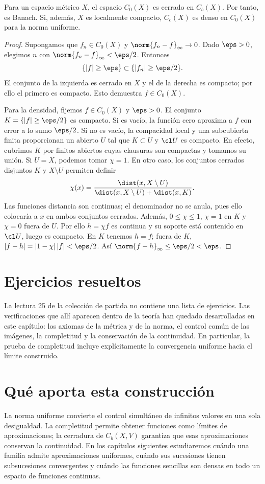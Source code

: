 \begin{proposicion}
Para un espacio métrico $X$, el espacio $C_0(X)$ es cerrado en $C_b(X)$. Por tanto, es Banach. Si, además, $X$ es localmente compacto, $C_c(X)$ es denso en $C_0(X)$ para la norma uniforme.
\end{proposicion}
\begin{proof}
Supongamos que $f_n\in C_0(X)$ y $\norm{f_n-f}_\infty\to0$. Dado $\eps>0$, elegimos $n$ con $\norm{f_n-f}_\infty<\eps/2$. Entonces
\[
 \{|f|\ge\eps\}\subset\{|f_n|\ge\eps/2\}.
\]
El conjunto de la izquierda es cerrado en $X$ y el de la derecha es compacto; por ello el primero es compacto. Esto demuestra $f\in C_0(X)$.

Para la densidad, fijemos $f\in C_0(X)$ y $\eps>0$. El conjunto $K=\{|f|\ge\eps/2\}$ es compacto. Si es vacío, la función cero aproxima a $f$ con error a lo sumo $\eps/2$. Si no es vacío, la compacidad local y una subcubierta finita proporcionan un abierto $U$ tal que $K\subset U$ y $\cl U$ es compacto. En efecto, cubrimos $K$ por finitos abiertos cuyas clausuras son compactas y tomamos su unión. Si $U=X$, podemos tomar $\chi=1$. En otro caso, los conjuntos cerrados disjuntos $K$ y $X\setminus U$ permiten definir
\[
 \chi(x)=\frac{\dist(x,X\setminus U)}{\dist(x,X\setminus U)+\dist(x,K)}.
\]
Las funciones distancia son continuas; el denominador no se anula, pues ello colocaría a $x$ en ambos conjuntos cerrados. Además, $0\le\chi\le1$, $\chi=1$ en $K$ y $\chi=0$ fuera de $U$. Por ello $h=\chi f$ es continua y su soporte está contenido en $\cl U$, luego es compacto. En $K$ tenemos $h=f$; fuera de $K$,
$|f-h|=|1-\chi|\,|f|<\eps/2$. Así $\norm{f-h}_\infty\le\eps/2<\eps$.
\end{proof}

\section{Ejercicios resueltos}
La lectura 25 de la colección de partida no contiene una lista de ejercicios. Las verificaciones que allí aparecen dentro de la teoría han quedado desarrolladas en este capítulo: los axiomas de la métrica y de la norma, el control común de las imágenes, la completitud y la conservación de la continuidad. En particular, la prueba de completitud incluye explícitamente la convergencia uniforme hacia el límite construido.

\section{Qué aporta esta construcción}
La norma uniforme convierte el control simultáneo de infinitos valores en una sola desigualdad. La completitud permite obtener funciones como límites de aproximaciones; la cerradura de $C_b(X,V)$ garantiza que esas aproximaciones conservan la continuidad. En los capítulos siguientes estudiaremos cuándo una familia admite aproximaciones uniformes, cuándo sus sucesiones tienen subsucesiones convergentes y cuándo las funciones sencillas son densas en todo un espacio de funciones continuas.
